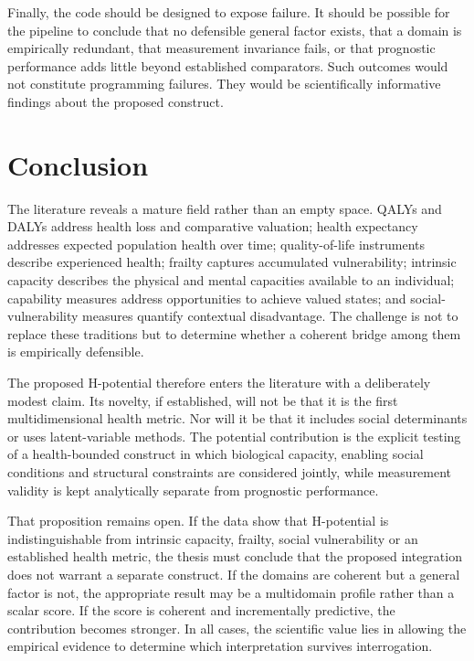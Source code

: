 Finally, the code should be designed to expose failure. It should be possible for the pipeline to conclude that no defensible general factor exists, that a domain is empirically redundant, that measurement invariance fails, or that prognostic performance adds little beyond established comparators. Such outcomes would not constitute programming failures. They would be scientifically informative findings about the proposed construct.

\section{Conclusion}

The literature reveals a mature field rather than an empty space. QALYs and DALYs address health loss and comparative valuation; health expectancy addresses expected population health over time; quality-of-life instruments describe experienced health; frailty captures accumulated vulnerability; intrinsic capacity describes the physical and mental capacities available to an individual; capability measures address opportunities to achieve valued states; and social-vulnerability measures quantify contextual disadvantage. The challenge is not to replace these traditions but to determine whether a coherent bridge among them is empirically defensible.

The proposed H-potential therefore enters the literature with a deliberately modest claim. Its novelty, if established, will not be that it is the first multidimensional health metric. Nor will it be that it includes social determinants or uses latent-variable methods. The potential contribution is the explicit testing of a health-bounded construct in which biological capacity, enabling social conditions and structural constraints are considered jointly, while measurement validity is kept analytically separate from prognostic performance.

That proposition remains open. If the data show that H-potential is indistinguishable from intrinsic capacity, frailty, social vulnerability or an established health metric, the thesis must conclude that the proposed integration does not warrant a separate construct. If the domains are coherent but a general factor is not, the appropriate result may be a multidomain profile rather than a scalar score. If the score is coherent and incrementally predictive, the contribution becomes stronger. In all cases, the scientific value lies in allowing the empirical evidence to determine which interpretation survives interrogation.
